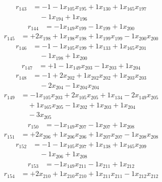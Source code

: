 \[\begin{aligned}
r_{143} &= - 1 - 1 x_{105} x_{195} + 1 x_{130} + 1 x_{165} x_{197} \\
 &\quad - 1 x_{194} + 1 x_{196}
\end{aligned}\]
\[\begin{aligned}
r_{144} &= - 1 x_{149} x_{199} - 1 x_{199} + 1 x_{200}
\end{aligned}\]
\[\begin{aligned}
r_{145} &= + 2 x_{198} + 1 x_{198} x_{198} + 1 x_{199} x_{199} - 1 x_{200} x_{200}
\end{aligned}\]
\[\begin{aligned}
r_{146} &= - 1 - 1 x_{105} x_{199} + 1 x_{133} + 1 x_{165} x_{201} \\
 &\quad - 1 x_{198} + 1 x_{200}
\end{aligned}\]
\[\begin{aligned}
r_{147} &= + 1 - 1 x_{149} x_{203} - 1 x_{203} + 1 x_{204}
\end{aligned}\]
\[\begin{aligned}
r_{148} &= - 1 + 2 x_{202} + 1 x_{202} x_{202} + 1 x_{203} x_{203} \\
 &\quad - 2 x_{204} - 1 x_{204} x_{204}
\end{aligned}\]
\[\begin{aligned}
r_{149} &= - 1 x_{105} x_{203} + 2 x_{105} x_{205} + 1 x_{134} - 2 x_{149} x_{205} \\
 &\quad + 1 x_{165} x_{205} - 1 x_{202} + 1 x_{203} + 1 x_{204} \\
 &\quad - 3 x_{205}
\end{aligned}\]
\[\begin{aligned}
r_{150} &= - 1 x_{149} x_{207} - 1 x_{207} + 1 x_{208}
\end{aligned}\]
\[\begin{aligned}
r_{151} &= + 2 x_{206} + 1 x_{206} x_{206} + 1 x_{207} x_{207} - 1 x_{208} x_{208}
\end{aligned}\]
\[\begin{aligned}
r_{152} &= - 1 - 1 x_{105} x_{207} + 1 x_{138} + 1 x_{165} x_{209} \\
 &\quad - 1 x_{206} + 1 x_{208}
\end{aligned}\]
\[\begin{aligned}
r_{153} &= - 1 x_{149} x_{211} - 1 x_{211} + 1 x_{212}
\end{aligned}\]
\[\begin{aligned}
r_{154} &= + 2 x_{210} + 1 x_{210} x_{210} + 1 x_{211} x_{211} - 1 x_{212} x_{212}
\end{aligned}\]
